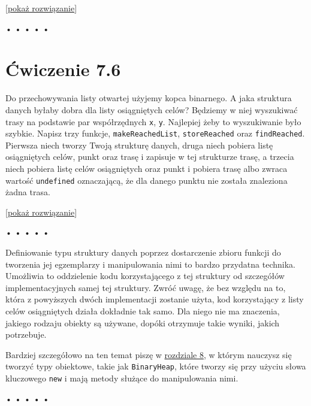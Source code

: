   
[\hyperref[sol:7.5]{pokaż rozwiązanie}]
  


\begin{center}
• • • • •
\end{center}

  
\section*{Ćwiczenie 7.6}
\label{sec:7.6}
  

Do przechowywania listy otwartej użyjemy kopca binarnego. A jaka struktura danych byłaby dobra dla listy osiągniętych celów? Będziemy w niej wyszukiwać trasy na podstawie par współrzędnych \texttt{x}, \texttt{y}. Najlepiej żeby to wyszukiwanie było szybkie. Napisz trzy funkcje, \texttt{makeReachedList}, \texttt{storeReached} oraz \texttt{findReached}. Pierwsza niech tworzy Twoją strukturę danych, druga niech pobiera listę osiągniętych celów, punkt oraz trasę i zapisuje w tej strukturze trasę, a trzecia niech pobiera listę celów osiągniętych oraz punkt i pobiera trasę albo zwraca wartość \texttt{undefined} oznaczającą, że dla danego punktu nie została znaleziona żadna trasa.

[\hyperref[sol:7.6]{pokaż rozwiązanie}]
  


\begin{center}
• • • • •
\end{center}

  
Definiowanie typu struktury danych poprzez dostarczenie zbioru funkcji do tworzenia jej egzemplarzy i manipulowania nimi to bardzo przydatna technika. Umożliwia to oddzielenie kodu korzystającego z tej struktury od szczegółów implementacyjnych samej tej struktury. Zwróć uwagę, że bez względu na to, która z powyższych dwóch implementacji zostanie użyta, kod korzystający z listy celów osiągniętych działa dokładnie tak samo. Dla niego nie ma znaczenia, jakiego rodzaju obiekty są używane, dopóki otrzymuje takie wyniki, jakich potrzebuje.

  
Bardziej szczegółowo na ten temat piszę w \hyperref[chap:8]{rozdziale 8}, w którym nauczysz się tworzyć typy obiektowe, takie jak \texttt{BinaryHeap}, które tworzy się przy użyciu słowa kluczowego \texttt{new} i mają metody służące do manipulowania nimi.



\begin{center}
• • • • •
\end{center}

